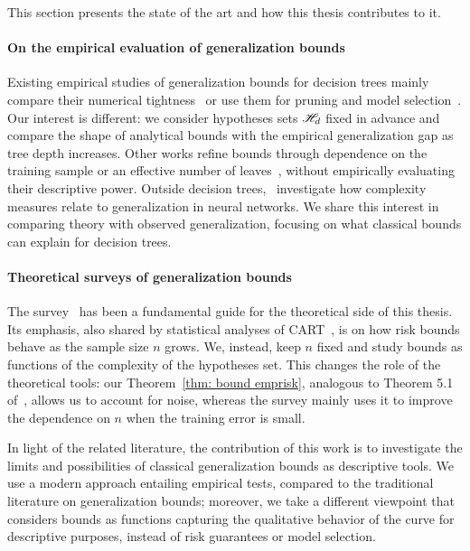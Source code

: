 This section presents the state of the art and how this thesis contributes to it.

\medskip

\paragraph{On the empirical evaluation of generalization bounds}
Existing empirical studies of generalization bounds for decision trees mainly compare their numerical tightness~\cite{kaariainen2005comparison,pichuka2007tighter} or use them for pruning and model selection~\cite{kaariainen2004selective,leboeuf2022generalization,yildiz2015vc}. Our interest is different: we consider hypotheses sets $\mathscr{H}_d$ fixed in advance and compare the shape of analytical bounds with the empirical generalization gap as tree depth increases. Other works refine bounds through dependence on the training sample or an effective number of leaves~\cite{mansour2000generalization,golea1998generalization,bartlett2002rademacher}, without empirically evaluating their descriptive power. Outside decision trees,~\cite{jiang2019fantastic} investigate how complexity measures relate to generalization in neural networks. We share this interest in comparing theory with observed generalization, focusing on what classical bounds can explain for decision trees.

\medskip
\paragraph{Theoretical surveys of generalization bounds}
The survey~\cite{boucheron2005theory} has been a fundamental guide for the theoretical side of this thesis. Its emphasis, also shared by statistical analyses of CART~\cite{klusowski2024large}, is on how risk bounds behave as the sample size $n$ grows. We, instead, keep $n$ fixed and study bounds as functions of the complexity of the hypotheses set. This changes the role of the theoretical tools: our Theorem~\ref{thm: bound emprisk}, analogous to Theorem 5.1 of~\cite{boucheron2005theory}, allows us to account for noise, whereas the survey mainly uses it to improve the dependence on $n$ when the training error is small.

In light of the related literature, the contribution of this work is to investigate the limits and possibilities of classical generalization bounds as descriptive tools. We use a modern approach entailing empirical tests, compared to the traditional literature on generalization bounds; moreover, we take a different viewpoint that considers bounds as functions capturing the qualitative behavior of the curve for descriptive purposes, instead of risk guarantees or model selection.  